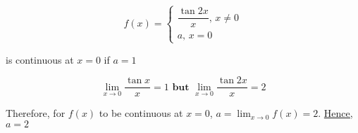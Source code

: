 \documentclass[14pt,fleqn]{extarticle}
\begin{document}
\begin{snippet}
    
    \incorrect
    
    \[ f(x) = \begin{cases}
\dfrac{\tan 2x}{x},\, x\neq 0 \\ 
a,\, x = 0  
\end{cases} \]

is continuous at $x=0$ if $a = 1$
%

    \reason

\[\lim_{x\to 0}\dfrac{\tan x}{x} = 1\textbf{ but } \lim_{x\to 0}\dfrac{\tan 2x}{x} = 2 \]

Therefore, for $f(x)$ to be continuous
at $x=0$, $ a = \lim_{x\to 0}f(x) = 2$. \underline{Hence, $a = 2$}
%
    
\end{snippet} 
\end{document}
